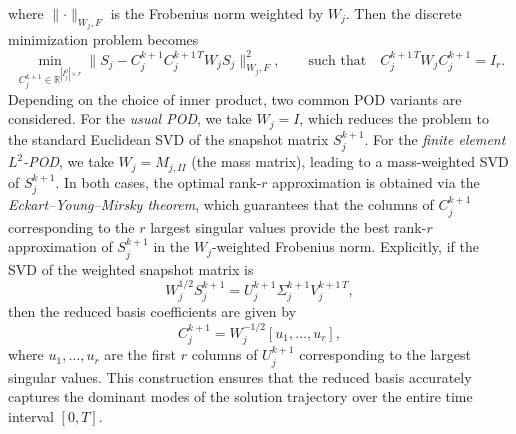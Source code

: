 \documentclass[a4paper, 11pt]{article}
\theoremstyle{remark}
\begin{document}
where $\lVert \cdot\rVert_{W_{j}, F}$ is the Frobenius norm weighted by $W_{j}$. Then the discrete minimization problem becomes
\begin{equation*}
    \min_{C^{k+1}_{j}\in \mathbb{R}^{|I_{j}^{0}|\times r}}\lVert S_{j} - C^{k+1}_{j}C^{k+1\, T}_{j}W_{j}S_{j}\rVert_{W_{j}, F}^{2}, \qquad \text{such that} \quad C^{k+1\, T}_{j}W_{j}C^{k+1}_{j} = I_{r}.
\end{equation*}
Depending on the choice of inner product, two common POD variants are considered. For the \emph{usual POD}, we take $W_{j} = I$, which reduces the problem to the standard Euclidean SVD of the snapshot matrix $S^{k+1}_j$. For the \emph{finite element $L^2$-POD}, we take $W_{j} = M_{j, II}$ (the mass matrix), leading to a mass-weighted SVD of $S^{k+1}_j$. In both cases, the optimal rank-$r$ approximation is obtained via the \emph{Eckart--Young--Mirsky theorem}, which guarantees that the columns of $C^{k+1}_j$ corresponding to the $r$ largest singular values provide the best rank-$r$ approximation of $S^{k+1}_j$ in the $W_{j}$-weighted Frobenius norm. Explicitly, if the SVD of the weighted snapshot matrix is
\begin{equation*}
    W_{j}^{1/2} S^{k+1}_j = U^{k+1}_{j} \Sigma^{k+1}_{j} V^{k+1\, T}_{j},
\end{equation*}
then the reduced basis coefficients are given by
\begin{equation*}
    C^{k+1}_j = W_{j}^{-1/2} [u_1, \dots, u_r],
\end{equation*}
where $u_1, \dots, u_r$ are the first $r$ columns of $U^{k+1}_{j}$ corresponding to the largest singular values. This construction ensures that the reduced basis accurately captures the dominant modes of the solution trajectory over the entire time interval $[0,T]$.
\end{document}
